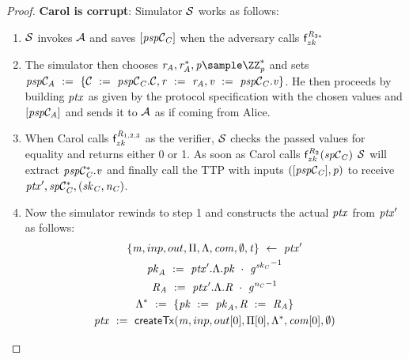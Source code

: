 \begin{proof}
    \textbf{Carol is corrupt}: Simulator $\mathcal{S}$ works as follows:
    \begin{enumerate}
        \item $\mathcal{S}$ invokes $\mathcal{A}$ and saves $[\mathit{psp}\mathcal{C}_{\mathit{C}}]$ when the adversary calls $\mathsf{f}^{\mathit{R}_{3*}}_{zk}$
        \item The simulator then chooses $\varBlindingFactorAlice, \funStar{\varBlindingFactorAlice}, \varFundValue \sample \cnstIntegersPrimeWithoutZero{\varPrime}$ and sets \\ $\mathit{psp}\mathcal{C}_{\mathit{A}} ~:=~ \{ \mathcal{C} ~:=~ \mathit{psp}\mathcal{C}_{\mathit{C}}.\mathcal{C}, \mathit{r} ~:=~ \mathit{r}_{\mathit{A}}, \mathit{v} ~:=~ \mathit{psp}\mathcal{C}_{\mathit{C}}.\mathit{v} \}$.
        He then proceeds by building $\mathit{ptx}$ as given by the protocol specification with the chosen values and $[\mathit{psp}\mathcal{C}_{\mathit{A}}]$ and sends it to $\mathcal{A}$ as if coming from Alice.
        \item When Carol calls $\mathsf{f}^{\mathit{R}_{1,2,3}}_{zk}$ as the verifier, $\mathcal{S}$ checks the passed values for equality and returns either 0 or 1.
        As soon as Carol calls $\mathsf{f}^{\mathit{R}_{2}}_{zk}(\mathit{sp}\mathcal{C}_{\mathit{C}})$ $\mathcal{S}$ will extract $\mathit{p} \mathit{sp}\mathcal{C}_{\mathit{C}}^*.\mathit{v}$ and finally call the TTP with inputs $([\mathit{psp}\mathcal{C}_{\mathit{C}}], \mathit{p})$ to receive ${\mathit{ptx}}', \mathit{sp}\mathcal{C}_{\mathit{C}}^*, (\mathit{sk}_{\mathit{C}}, \mathit{\mathit{n}_{\mathit{C}}})$.
        \item Now the simulator rewinds to step 1 and constructs the actual $\mathit{ptx}$ from ${\mathit{ptx}}'$ as follows:
        \begin{gather*}
            \{ \varMsg, \varInputs, \varOutputs, \varProofs, \varSigContext, \varCommits, \cnstEmptySet, \varTime \} \opFunResult \funStarAlt{\varPreTx} \\
            \varPubKeyAlice \opAssign \funStarAlt{\varPreTx}.\varSigContext.\varPubKey \opAddPoint {\funGen{\varSecKeyCarol}}^{-1} \\
            \varRandAlice \opAssign \funStarAlt{\varPreTx}.\varSigContext.\varRand \opAddPoint {\funGen{\varNonceCarol}}^{-1} \\
            \funStar{\varSigContext} \opAssign \{ \varPubKey \opAssign \varPubKeyAlice, \varRand \opAssign \varRandAlice \} \\
            \varPreTx \opAssign \procCreatePreTx{\varMsg}{\varInputs}{\varOutputs[0]}{\varProofs[0]}{\funStar{\varSigContext}}{\varCommits[0]}{\cnstEmptySet}{\varTime}

\end{gather*}
\end{enumerate}
\end{proof}
